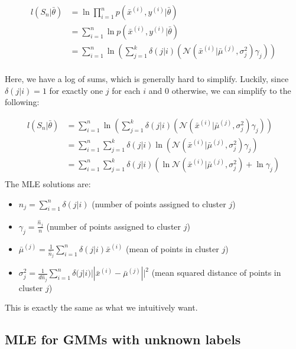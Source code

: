 \documentclass[12pt]{article}
\begin{document}
\[ 
	\begin{aligned}
		l(S_n | \bar{\theta}) &= \ln \prod_{i=1}^n p(\bar{x}^{(i)}, y^{(i)} | \bar{\theta})\\
					&= \sum_{i=1}^n \ln p(\bar{x}^{(i)}, y^{(i)} | \bar{\theta})\\
					&= \sum_{i=1}^n \ln \left(\sum_{j=1}^k \delta(j|i) (\mathcal{N}(\bar x^{(i)}| \bar{\mu}^{(j)}, \sigma^2_j)\gamma_j)\right)\\
	\end{aligned}
\]

Here, we have a log of sums, which is generally hard to simplify. Luckily, since $\delta(j|i) = 1$ for exactly one $j$ for each $i$ and 0 otherwise, we can simplify to the following:

\[ 
	\begin{aligned}
		l(S_n | \bar{\theta}) &= \sum_{i=1}^n \ln \left(\sum_{j=1}^k \delta(j|i) (\mathcal{N}(\bar x^{(i)}| \bar{\mu}^{(j)}, \sigma^2_j)\gamma_j)\right)\\
													&= \sum_{i=1}^n \sum_{j=1}^k \delta(j|i) \ln (\mathcal{N}(\bar x^{(i)}| \bar{\mu}^{(j)}, \sigma^2_j)\gamma_j)\\
													&= \sum_{i=1}^n \sum_{j=1}^k \delta(j|i) \left(\ln \mathcal{N}(\bar x^{(i)}| \bar{\mu}^{(j)}, \sigma^2_j) + \ln \gamma_j\right)\\
	\end{aligned}
\]
\newpage
The MLE solutions are:

\begin{itemize}
	\item $\hat n_j = \sum_{i=1}^n \delta(j|i)$ (number of points assigned to cluster $j$)
	\item $\gamma_j = \frac {\hat n_j} n$ (number of points assigned to cluster $j$)
	\item $\bar{\mu}^{(j)} = \frac 1 {\hat n_j}\sum_{i=1}^n \delta(j|i) \bar x^{(i)}$ (mean of points in cluster $j$)
	\item $\sigma_j^2 = \frac 1 {d\hat n_j} \sum_{i=1}^n \delta(j|i) ||\bar x^{(i)} - \bar{\mu}^{(j)}||^2$ (mean squared distance of points in cluster $j$)
\end{itemize}

This is exactly the same as what we intuitively want.

\subsection{MLE for GMMs with unknown labels}
\end{document}

